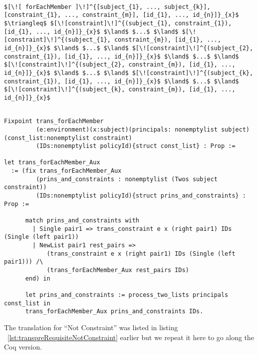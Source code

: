\lstset{mathescape, language=AST}  
\begin{lstlisting}[frame=single, caption={ForEachMember Translation {$\colon$} Count by Principal},label={lst:transforEachMember}]

$[\![ forEachMember ]\!]^{[subject_{1}, ..., subject_{k}], [constraint_{1}, ..., constraint_{m}], [id_{1}, ..., id_{n}]}_{x}$ $\triangleq$ $[\![constraint]\!]^{(subject_{1}, constraint_{1}), [id_{1}, ..., id_{n}]}_{x}$ $\land$ $...$ $\land$ $[\![constraint]\!]^{(subject_{1}, constraint_{m}), [id_{1}, ..., id_{n}]}_{x}$ $\land$ $...$ $\land$ $[\![constraint]\!]^{(subject_{2}, constraint_{1}), [id_{1}, ..., id_{n}]}_{x}$ $\land$ $...$ $\land$ $[\![constraint]\!]^{(subject_{2}, constraint_{m}), [id_{1}, ..., id_{n}]}_{x}$ $\land$ $...$ $\land$ $[\![constraint]\!]^{(subject_{k}, constraint_{1}), [id_{1}, ..., id_{n}]}_{x}$ $\land$ $...$ $\land$ $[\![constraint]\!]^{(subject_{k}, constraint_{m}), [id_{1}, ..., id_{n}]}_{x}$ 

\end{lstlisting}

\begin{lstlisting}

Fixpoint trans_forEachMember
         (e:environment)(x:subject)(principals: nonemptylist subject)(const_list:nonemptylist constraint)
         (IDs:nonemptylist policyId){struct const_list} : Prop := 

let trans_forEachMember_Aux   
  := (fix trans_forEachMember_Aux
         (prins_and_constraints : nonemptylist (Twos subject constraint))
         (IDs:nonemptylist policyId){struct prins_and_constraints} : Prop :=

      match prins_and_constraints with
        | Single pair1 => trans_constraint e x (right pair1) IDs (Single (left pair1)) 
        | NewList pair1 rest_pairs =>
            (trans_constraint e x (right pair1) IDs (Single (left pair1))) /\
            (trans_forEachMember_Aux rest_pairs IDs)
      end) in

      let prins_and_constraints := process_two_lists principals const_list in
      trans_forEachMember_Aux prins_and_constraints IDs.

\end{lstlisting}


The translation for ``Not Constraint'' was listed in listing ~\ref{lst:transpreRequisiteNotConstraint} earlier but we repeat it here to go along the Coq version. 

